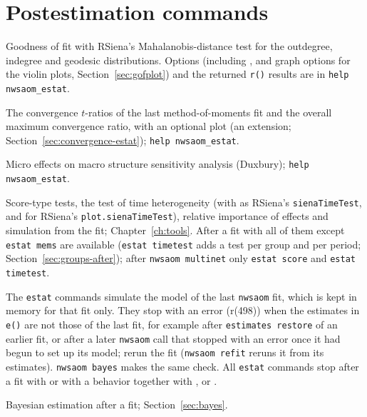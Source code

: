 \section{Postestimation commands}\label{sec:postest}

\begin{description}[nosep,style=nextline]
  \item[\texttt{estat gof}] Goodness of fit with RSiena's Mahalanobis-distance test for the outdegree, indegree and geodesic distributions. Options (including ,  and graph options for the violin plots, Section~\ref{sec:gofplot}) and the returned \texttt{r()} results are in \texttt{help nwsaom\_estat}.
  \item[\texttt{estat convergence}] The convergence $t$-ratios of the last method-of-moments fit and the overall maximum convergence ratio, with an optional plot (an extension; Section~\ref{sec:convergence-estat}); \texttt{help nwsaom\_estat}.
  \item[\texttt{estat mems}] Micro effects on macro structure sensitivity analysis (Duxbury); \texttt{help nwsaom\_estat}.
  \item[\texttt{estat score}, \texttt{estat timetest}, \texttt{estat importance}, \texttt{estat simulate}] Score-type tests, the test of time heterogeneity (with  as RSiena's \texttt{sienaTimeTest}, and  for RSiena's \texttt{plot.sienaTimeTest}), relative importance of effects and simulation from the fit; Chapter~\ref{ch:tools}. After a fit with  all of them except \texttt{estat mems} are available (\texttt{estat timetest} adds a test per group and per period; Section~\ref{sec:groups-after}); after \texttt{nwsaom multinet} only \texttt{estat score} and \texttt{estat timetest}.
  \item[\textnormal{\emph{Which model the \texttt{estat} commands use.}}] The \texttt{estat} commands simulate the model of the last \texttt{nwsaom} fit, which is kept in memory for that fit only. They stop with an error (r(498)) when the estimates in \texttt{e()} are not those of the last fit, for example after \texttt{estimates restore} of an earlier fit, or after a later \texttt{nwsaom} call that stopped with an error once it had begun to set up its model; rerun the fit (\texttt{nwsaom refit} reruns it from its estimates). \texttt{nwsaom bayes} makes the same check. All \texttt{estat} commands stop after a fit with  or with a behavior together with ,  or .
  \item[\texttt{nwsaom bayes}] Bayesian estimation after a fit; Section~\ref{sec:bayes}.

\end{description}
